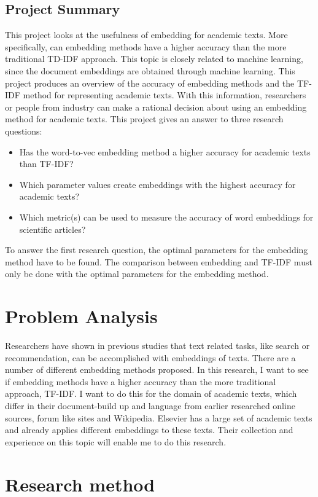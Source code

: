 \documentclass[10pt,a4paper]{article}
\begin{document}
\subsection{Project Summary}
This project looks at the usefulness of embedding for academic texts. More specifically, can embedding methods have a higher accuracy than the more traditional TD-IDF approach. This topic is closely related to machine learning, since the document embeddings are obtained through machine learning. This project produces an overview of the accuracy of embedding methods and the TF-IDF method for representing academic texts. With this information, researchers or people from industry can make a rational decision about using an embedding method for academic texts. This project gives an answer to three research questions:
\begin{itemize}
\item{Has the word-to-vec embedding method a higher accuracy for academic texts than TF-IDF?}
\item{Which parameter values create embeddings with the highest accuracy for academic texts?}
\item{Which metric(s) can be used to measure the accuracy of word embeddings for scientific articles?}
\end{itemize}
To answer the first research question, the optimal parameters for the embedding method have to be found. The comparison between embedding and TF-IDF must only be done with the optimal parameters for the embedding method.
\section{Problem Analysis}
Researchers have shown in previous studies that text related tasks, like search or recommendation, can be accomplished with embeddings of texts. There are a number of different embedding methods proposed. In this research, I want to see if embedding methods have a higher accuracy than the more traditional approach, TF-IDF. I want to do this for the domain of academic texts, which differ in their document-build up and language from earlier researched online sources, forum like sites and Wikipedia. Elsevier has a large set of academic texts and already applies different embeddings to these texts. Their collection and experience on this topic will enable me to do this research.

\section{Research method}
\end{document}
